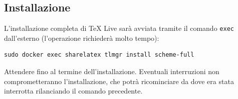 \subsection{Installazione}
L'installazione completa di TeX Live sarà avviata tramite il comando \verb|exec| dall'esterno (l'operazione richiederà molto tempo):
\begin{lstlisting}
sudo docker exec sharelatex tlmgr install scheme-full
\end{lstlisting}
Attendere fino al termine dell'installazione. Eventuali interruzioni non comprometteranno l'installazione, che potrà ricominciare da dove era stata interrotta rilanciando il comando precedente.